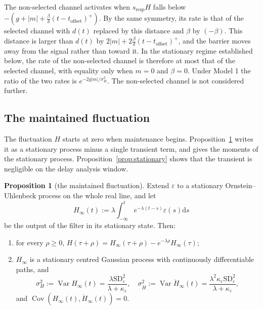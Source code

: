 \documentclass[a4paper,11pt]{article}
\theoremstyle{definition}
\newtheorem{proposition}{Proposition}
\newcommand{\Var}{\operatorname{Var}}
\newcommand{\Cov}{\operatorname{Cov}}
\newcommand{\dd}{\mathrm d}
\newcommand{\1}{\mathbbm{1}}
\begin{document}
The non-selected channel activates when ${s}_{\mathrm{resp}}H$ falls below $-\left(g+\left|m\right|+\frac{\beta }{\delta }{\left(t-{t}_{\mathrm{offset}}\right)}^{+}\right)$. By the same symmetry, its rate is that of the selected channel with $d\left(t\right)$ replaced by this distance and $\beta$ by $(-\beta)$. This distance is larger than $d\left(t\right)$ by $2\left|m\right|+2\frac{\beta }{\delta }{\left(t-{t}_{\mathrm{offset}}\right)}^{+}$, and the barrier moves away from the signal rather than toward it. In the stationary regime established below, the rate of the non-selected channel is therefore at most that of the selected channel, with equality only when $m=0$ and $\beta =0$. Under Model 1 the ratio of the two rates is ${e}^{-2g\left|m\right|/{\sigma }_{H}^{2}}$. The non-selected channel is not considered further.

\subsection{The maintained fluctuation}

The fluctuation $H$ starts at zero when maintenance begins. Proposition~\ref{prop:H} writes it as a stationary process minus a single transient term, and gives the moments of the stationary process. Proposition~\ref{prop:stationary} shows that the transient is negligible on the delay analysis window.

\begin{proposition}[the maintained fluctuation]\label{prop:H}
Extend $\varepsilon$ to a stationary Ornstein--Uhlenbeck process on the whole real line, and let
\begin{equation*}
H_{\infty}(t):=\lambda\int_{-\infty}^{t}e^{-\lambda(t-s)}\varepsilon(s)\dd s
\end{equation*}
be the output of the filter in its stationary state. Then:
\begin{enumerate}
\item[(i)] for every $\rho\ge 0$, $H(\tau+\rho)=H_{\infty}(\tau+\rho)-e^{-\lambda\rho}H_{\infty}(\tau)$;
\item[(ii)] $H_{\infty}$ is a stationary centred Gaussian process with continuously differentiable paths, and
\begin{equation}\label{eq:asymp_moments}
\sigma_{H}^{2}:=\Var H_{\infty}(t)=\frac{\lambda\mathrm{SD}_{\varepsilon}^{2}}{\lambda+\kappa_{\varepsilon}}, \quad
\sigma_{\dot{H}}^{2}:=\Var \dot{H}_{\infty}(t)=\frac{\lambda^{2}\kappa_{\varepsilon}\mathrm{SD}_{\varepsilon}^{2}}{\lambda+\kappa_{\varepsilon}},
\end{equation}
and $\Cov\left(H_{\infty}(t),\dot{H}_{\infty}(t)\right)=0$.
\end{enumerate}
\end{proposition}
\end{document}
